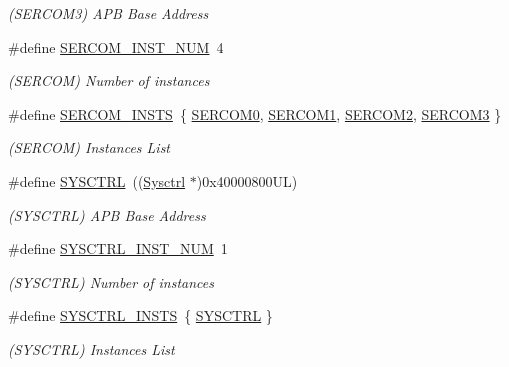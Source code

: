 \begin{DoxyCompactItemize}
\begin{DoxyCompactList}\small\item\em (S\+E\+R\+C\+O\+M3) A\+PB Base Address \end{DoxyCompactList}\item 
\#define \mbox{\hyperlink{group___s_a_m_d21_e15_l__base_ga75f7d8cff25db3f1353efb6f7990fce5}{S\+E\+R\+C\+O\+M\+\_\+\+I\+N\+S\+T\+\_\+\+N\+UM}}~4
\begin{DoxyCompactList}\small\item\em (S\+E\+R\+C\+OM) Number of instances \end{DoxyCompactList}\item 
\#define \mbox{\hyperlink{group___s_a_m_d21_e15_l__base_gadb03dbe1ef2a3400f0a16b58948053a7}{S\+E\+R\+C\+O\+M\+\_\+\+I\+N\+S\+TS}}~\{ \mbox{\hyperlink{group___s_a_m_d21_j18_a__base_gae5473788457bad0e69ad9d7f22ed404f}{S\+E\+R\+C\+O\+M0}}, \mbox{\hyperlink{group___s_a_m_d21_j18_a__base_ga130d7d7bc9ef1da1ba1bd094b42449d7}{S\+E\+R\+C\+O\+M1}}, \mbox{\hyperlink{group___s_a_m_d21_j18_a__base_ga918e4c85993961a115bb23b4bb73a87f}{S\+E\+R\+C\+O\+M2}}, \mbox{\hyperlink{group___s_a_m_d21_j18_a__base_gac9f8240be5a40b46cb09617323ebc7e3}{S\+E\+R\+C\+O\+M3}} \}
\begin{DoxyCompactList}\small\item\em (S\+E\+R\+C\+OM) Instances List \end{DoxyCompactList}\item 
\#define \mbox{\hyperlink{group___s_a_m_d21_e15_l__base_gaf94c5196d5506d0a34a0938d9bdb480f}{S\+Y\+S\+C\+T\+RL}}~((\mbox{\hyperlink{struct_sysctrl}{Sysctrl}}  $\ast$)0x40000800\+U\+L)
\begin{DoxyCompactList}\small\item\em (S\+Y\+S\+C\+T\+RL) A\+PB Base Address \end{DoxyCompactList}\item 
\#define \mbox{\hyperlink{group___s_a_m_d21_e15_l__base_ga495a137cee2c9c865f8dbab50616d71f}{S\+Y\+S\+C\+T\+R\+L\+\_\+\+I\+N\+S\+T\+\_\+\+N\+UM}}~1
\begin{DoxyCompactList}\small\item\em (S\+Y\+S\+C\+T\+RL) Number of instances \end{DoxyCompactList}\item 
\#define \mbox{\hyperlink{group___s_a_m_d21_e15_l__base_ga5fe4eb4329cd6e474576a0adb5be13c0}{S\+Y\+S\+C\+T\+R\+L\+\_\+\+I\+N\+S\+TS}}~\{ \mbox{\hyperlink{group___s_a_m_d21_j18_a__base_gaf94c5196d5506d0a34a0938d9bdb480f}{S\+Y\+S\+C\+T\+RL}} \}
\begin{DoxyCompactList}\small\item\em (S\+Y\+S\+C\+T\+RL) Instances List \end{DoxyCompactList}\item 

\end{DoxyCompactItemize}

